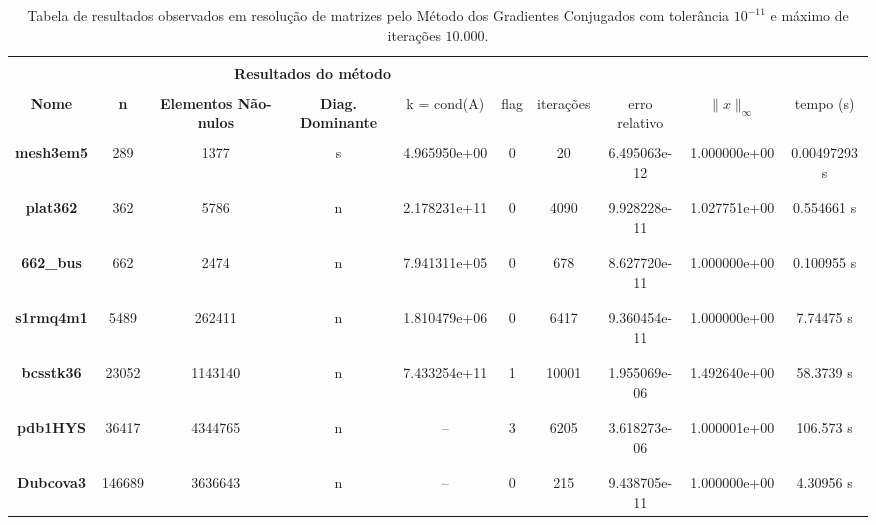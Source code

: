 
\begin{table}[ht]
    \centering
    \begin{tabular}{|c|c|c|c|c|c|c|c|c| c|}
        \hline \rowcolor{Gray}
        \multicolumn{10}{|c|}{\bfseries Tabela do Método dos Gradientes Conjugados com tolerância $10^{-11}$ e máximo de iterações $10.000$ }\\
        \hline \rowcolor{Gray}  \multicolumn{5}{|c|}{} & \multicolumn{5}{|c|}{} \\
         [-1em]  \rowcolor{Gray}
         \multicolumn{5}{|c|}{\bfseries Informações da matriz } & \multicolumn{5}{|c|}{\bfseries Resultados do método }\\
         \hline \rowcolor{Gray} & & & & & & & & & \\
         [-1em]
         \rowcolor{Gray}
         \bfseries Nome & \bfseries n & \bfseries Elementos Não-nulos & \bfseries Diag. Dominante &
         k = cond(A) & flag & iterações &
         erro relativo &
         $\|x\|_\infty$  & tempo (s) \\
         \hline & & & & & & & & & \\
         [-1em] \bfseries mesh3em5 & 289 & 1377 & s & 4.965950e+00 & 0 & 20 & 6.495063e-12 & 1.000000e+00 & 0.00497293 s \\ & & & & & & & & & \\ [-1em] \hline \\
         [-1em] \bfseries plat362 & 362 & 5786 & n & 2.178231e+11 & 0 & 4090 & 9.928228e-11 & 1.027751e+00 & 0.554661 s \\ & & & & & & & & & \\ [-1em] \hline \\
         [-1em] \bfseries 662\_bus & 662 & 2474 & n & 7.941311e+05 & 0 & 678 & 8.627720e-11 & 1.000000e+00 & 0.100955 s \\ & & & & & & & & & \\ [-1em] \hline \\
         [-1em] \bfseries s1rmq4m1 & 5489 & 262411 & n  & 1.810479e+06 & 0 & 6417 & 9.360454e-11 & 1.000000e+00 & 7.74475 s \\ & & & & & & & & & \\ [-1em] \hline \\
         [-1em] \bfseries bcsstk36 & 23052 & 1143140 & n & 7.433254e+11 &  1 & 10001 & 1.955069e-06 & 1.492640e+00  & 58.3739 s \\ & & & & & & & & & \\ [-1em] \hline \\
         [-1em] \bfseries pdb1HYS & 36417 & 4344765 & n & -- & 3 & 6205 & 3.618273e-06 & 1.000001e+00 & 106.573 s \\ & & & & & & & & &\\ [-1em] \hline \\
         [-1em] \bfseries Dubcova3 & 146689 & 3636643 & n & -- & 0 & 215 & 9.438705e-11 & 1.000000e+00 & 4.30956 s \\  \hline
    \end{tabular}
    \caption{Tabela de resultados observados em resolução de matrizes pelo Método dos Gradientes Conjugados com tolerância $10^{-11}$ e máximo de iterações $10.000$.}
    \label{tab:resultados-10k-11}
\end{table}
